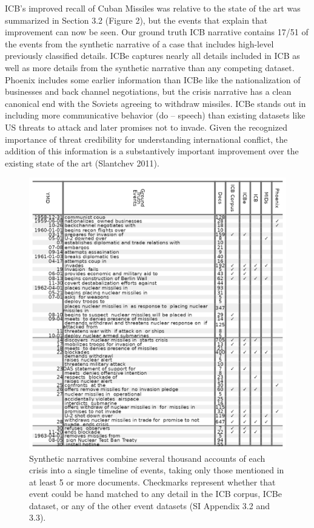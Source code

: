 \documentclass{article}
\begin{document}
ICB's improved recall of Cuban Missiles was relative to the state of the
art was summarized in Section 3.2 (Figure 2), but the events that
explain that improvement can now be seen. Our ground truth ICB narrative
contains 17/51 of the events from the synthetic narrative of a case that
includes high-level previously classified details. ICBe captures nearly
all details included in ICB as well as more details from the synthetic
narrative than any competing dataset. Phoenix includes some earlier
information than ICBe like the nationalization of businesses and back
channel negotiations, but the crisis narrative has a clean canonical end
with the Soviets agreeing to withdraw missiles. ICBe stands out in
including more communicative behavior (do -- speech) than existing
datasets like US threats to attack and later promises not to invade.
Given the recognized importance of threat credibility for understanding
international conflict, the addition of this information is a
substantively important improvement over the existing state of the art
(Slantchev 2011).

\begin{figure}
\hypertarget{fig-recall-cuba}{%
\centering
\includegraphics{case_study_cuban_recall.png}
\caption{Synthetic narratives combine several thousand accounts of each
crisis into a single timeline of events, taking only those mentioned in
at least 5 or more documents. Checkmarks represent whether that event
could be hand matched to any detail in the ICB corpus, ICBe dataset, or
any of the other event datasets (SI Appendix 3.2 and
3.3).}\label{fig-recall-cuba}
}
\end{figure}
\end{document}
